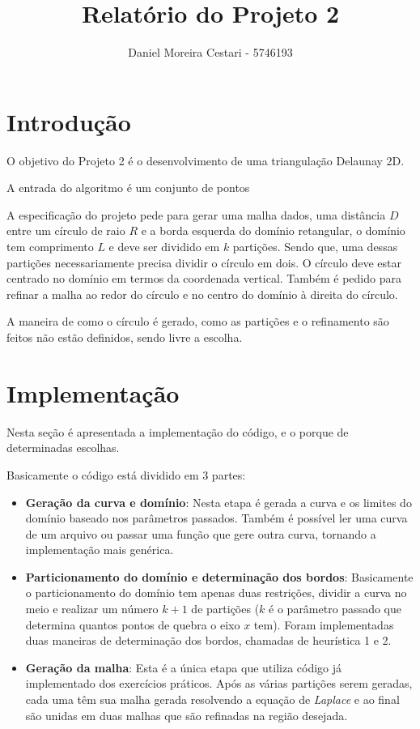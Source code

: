\documentclass[a4paper]{article}
\title{Relatório do Projeto 2}
\author{Daniel Moreira Cestari - 5746193}
\begin{document}
\maketitle

\section{Introdução}

O objetivo do Projeto 2 é o desenvolvimento de uma triangulação Delaunay 2D.  

A entrada do algoritmo é um conjunto de pontos

A especificação do projeto pede para gerar uma malha dados, uma distância $D$ entre um círculo de raio $R$ e a borda esquerda do domínio retangular, o domínio tem comprimento $L$ e deve ser dividido em $k$ partições. Sendo que, uma dessas partições necessariamente precisa dividir o círculo em dois. O círculo deve estar centrado no domínio em termos da coordenada vertical. Também é pedido para refinar a malha ao redor do círculo e no centro do domínio à direita do círculo.

A maneira de como o círculo é gerado, como as partições e o refinamento são feitos não estão definidos, sendo livre a escolha.


\section{Implementação}

Nesta seção é apresentada a implementação do código, e o porque de determinadas escolhas.

Basicamente o código está dividido em 3 partes:
\begin{itemize}
	\item \textbf{Geração da curva e domínio}: Nesta etapa é gerada a curva e os limites do domínio baseado nos parâmetros passados. Também é possível ler uma curva de um arquivo ou passar uma função que gere outra curva, tornando a implementação mais genérica.
	
	\item \textbf{Particionamento do domínio e determinação dos bordos}: Basicamente o particionamento do domínio tem apenas duas restrições, dividir a curva no meio e realizar um número $k+1$ de partições ($k$ é o parâmetro passado que determina quantos pontos de quebra o eixo $x$ tem).
	Foram implementadas duas maneiras de determinação dos bordos, chamadas de heurística 1 e 2.
	
	\item \textbf{Geração da malha}: Esta é a única etapa que utiliza código já implementado dos exercícios práticos. Após as várias partições serem geradas, cada uma têm sua malha gerada resolvendo a equação de \textit{Laplace} e ao final são unidas em duas malhas que são refinadas na região desejada.
	
\end{itemize}
\end{document}
